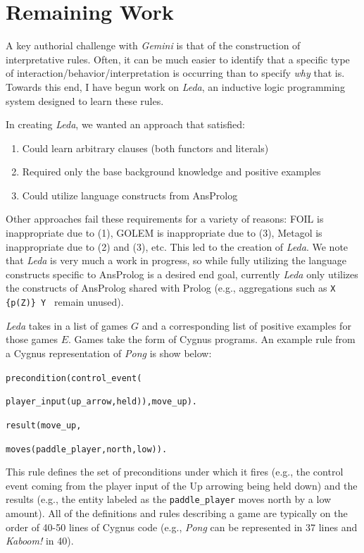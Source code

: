 \documentclass[12pt]{report}
\begin{document}
\section*{Remaining Work}

A key authorial challenge with \textit{Gemini} is that of the construction of interpretative rules.  Often, it can be much easier to identify that a specific type of interaction/behavior/interpretation is occurring than to specify \textit{why} that is.  Towards this end, I have begun work on \textit{Leda}, an inductive logic programming system designed to learn these rules.


In creating \textit{Leda}, we wanted an approach that satisfied:

\begin{enumerate}
\item Could learn arbitrary clauses (both functors and literals)
\item Required only the base background knowledge and positive examples
\item Could utilize language constructs from AnsProlog
\end{enumerate}

Other approaches fail these requirements for a variety of reasons: FOIL is inappropriate due to (1), GOLEM is inappropriate due to (3), Metagol is inappropriate due to (2) and (3), etc. This led to the creation of \textit{Leda}. We note that \textit{Leda} is very much a work in progress, so while fully utilizing the language constructs specific to AnsProlog is a desired end goal, currently \textit{Leda} only utilizes the constructs of AnsProlog shared with Prolog (e.g., aggregations such as \texttt{X \{p(Z)\} Y } remain unused).

\textit{Leda} takes in a list of games $G$ and a corresponding list of positive examples for those games $E$. Games take the form of Cygnus \cite{martens2016proceduralist} programs. An example rule from a Cygnus representation of \textit{Pong} is show below:


\noindent \texttt{precondition(control\_event(}

\texttt{player\_input(up\_arrow,held)),move\_up).}

\noindent \texttt{result(move\_up,}

\texttt{moves(paddle\_player,north,low)).}

\noindent This rule defines the set of preconditions under which it fires (e.g., the control event coming from the player input of the Up arrowing being held down) and the results (e.g., the entity labeled as the \texttt{paddle\_player} moves north by a low amount). All of the definitions and rules describing a game are typically on the order of 40-50 lines of Cygnus code (e.g., \textit{Pong} can be represented in 37 lines and \textit{Kaboom!} in 40). 
\end{document}
